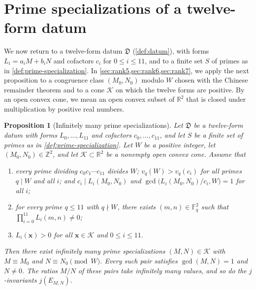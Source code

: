 \documentclass[12pt,oneside,openany]{book}
\theoremstyle{definition}
\theoremstyle{plain}
\numberwithin{equation}{chapter}
\theoremstyle{plain}
\newtheorem{proposition}[proposition]{Proposition}
\theoremstyle{definition}
\theoremstyle{remark}
\newcommand{\Z}{\mathbb Z}
\newcommand{\F}{\mathbb F}
\newcommand{\R}{\mathbb R}
\newcommand{\datum}{\mathfrak D}
\newcommand{\cK}{\mathcal K}
\begin{document}
\section{Prime specializations of a twelve-form datum}\label{sec:primes-infinitude}

We now return to a twelve-form datum $\datum$ (\cref{def:datum}), with forms $L_i=a_iM+b_iN$ and cofactors $c_i$ for $0\le i\le11$, and to a finite set $S$ of primes as in \cref{def:prime-specialization}. In \cref{sec:rank5,sec:rank6,sec:rank7}, we apply the next proposition to a congruence class $(M_0,N_0)$ modulo $W$ chosen with the Chinese remainder theorem and to a cone $\cK$ on which the twelve forms are positive. By an open convex cone, we mean an open convex subset of $\R^2$ that is closed under multiplication by positive real numbers.

\begin{proposition}[Infinitely many prime specializations]\label{prop:infinitely-many}
Let $\datum$ be a twelve-form datum with forms $L_0,\dots,L_{11}$ and cofactors $c_0,\dots,c_{11}$, and let $S$ be a finite set of primes as in \cref{def:prime-specialization}. Let $W$ be a positive integer, let $(M_0,N_0)\in\Z^2$, and let $\cK\subset\R^2$ be a nonempty open convex cone. Assume that
\begin{enumerate}[label=(\alph*)]
\item\label{item:inf-progression} every prime dividing $c_0c_1\cdots c_{11}$ divides $W$; $v_q(W)>v_q(c_i)$ for all primes $q\mid W$ and all $i$; and $c_i\mid L_i(M_0,N_0)$ and $\gcd\big(L_i(M_0,N_0)/c_i,W\big)=1$ for all $i$;
\item\label{item:inf-small-primes} for every prime $q\le11$ with $q\nmid W$, there exists $(m,n)\in\F_q^2$ such that $\prod_{i=0}^{11}L_i(m,n)\ne0$;
\item\label{item:inf-cone} $L_i(\mathbf x)>0$ for all $\mathbf x\in\cK$ and $0\le i\le11$.
\end{enumerate}
Then there exist infinitely many prime specializations $(M,N)\in\cK$ with $M\equiv M_0$ and $N\equiv N_0\pmod W$. Every such pair satisfies $\gcd(M,N)=1$ and $N\ne0$. The ratios $M/N$ of these pairs take infinitely many values, and so do the $j$-invariants $j(E_{M,N})$.
\end{proposition}
\end{document}

